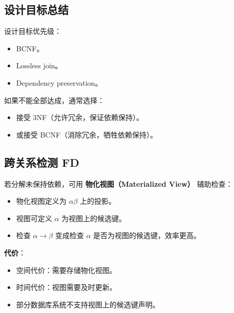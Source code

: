 \subsection{设计目标总结}

设计目标优先级：

\begin{itemize}
    \item BCNF。
    \item Lossless join。
    \item Dependency preservation。
\end{itemize}

如果不能全部达成，通常选择：

\begin{itemize}
    \item 接受 3NF（允许冗余，保证依赖保持）。
    \item 或接受 BCNF（消除冗余，牺牲依赖保持）。
\end{itemize}

\subsection{跨关系检测 FD}

若分解未保持依赖，可用 \textbf{物化视图（Materialized View）} 辅助检查：

\begin{itemize}
    \item 物化视图定义为 $\alpha\beta$ 上的投影。
    \item 视图可定义 $\alpha$ 为视图上的候选键。
    \item 检查 $\alpha \to \beta$ 变成检查 $\alpha$ 是否为视图的候选键，效率更高。
\end{itemize}

\textbf{代价}：

\begin{itemize}
    \item 空间代价：需要存储物化视图。
    \item 时间代价：视图需要及时更新。
    \item 部分数据库系统不支持视图上的候选键声明。
\end{itemize}

